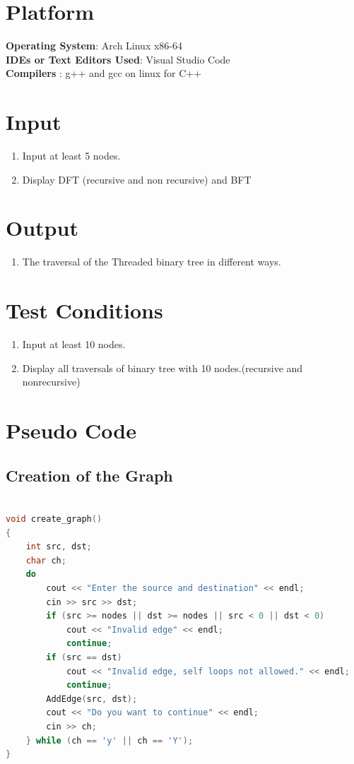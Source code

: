 \documentclass[11pt]{article}
\begin{document}


\section{Platform}
\textbf{\textbf{Operating System}}: Arch Linux x86-64 \\
\textbf{\textbf{IDEs or Text Editors Used}}: Visual Studio Code\\
\textbf{\textbf{Compilers} }: g++ and gcc on linux for C++\\

\section{Input}
\begin{enumerate}
    \item Input at least 5 nodes.
    \item Display DFT (recursive and non recursive) and BFT
\end{enumerate}

\section{Output}
\begin{enumerate}
    \item The traversal of the Threaded binary tree in different ways.
\end{enumerate}

\section{Test Conditions}
\begin{enumerate}
    \item Input at least 10 nodes.
    \item Display all traversals of binary tree with 10 nodes.(recursive and nonrecursive)
\end{enumerate}

\section{Pseudo Code}
\subsection{Creation of the Graph}
\begin{lstlisting}[language=C++]

void create_graph()
{
    int src, dst;
    char ch;
    do
        cout << "Enter the source and destination" << endl;
        cin >> src >> dst;
        if (src >= nodes || dst >= nodes || src < 0 || dst < 0)
            cout << "Invalid edge" << endl;
            continue;
        if (src == dst)
            cout << "Invalid edge, self loops not allowed." << endl;
            continue;
        AddEdge(src, dst);
        cout << "Do you want to continue" << endl;
        cin >> ch;
    } while (ch == 'y' || ch == 'Y');
}

\end{lstlisting}
\end{document}
